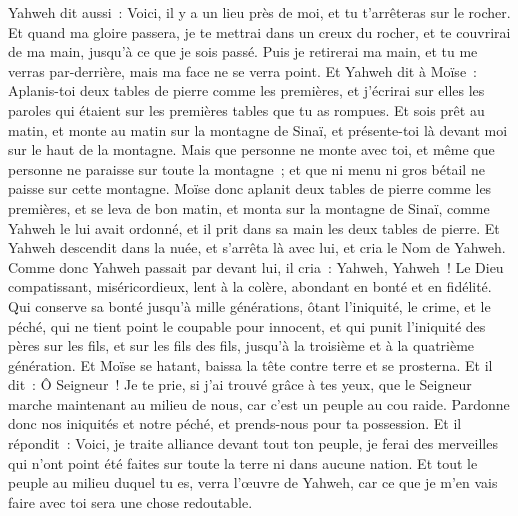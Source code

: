 \begin{multicols}{2}
Yahweh dit aussi~: Voici, il y a un lieu près de moi, et tu t'arrêteras sur le rocher.
Et quand ma gloire passera, je te mettrai dans un creux du rocher, et te couvrirai de ma main, jusqu'à ce que je sois passé.
Puis je retirerai ma main, et tu me verras par-derrière, mais ma face ne se verra point.
\VerseOne{}Et Yahweh dit à Moïse~: Aplanis-toi deux tables de pierre comme les premières, et j'écrirai sur elles les paroles qui étaient sur les premières tables que tu as rompues.
Et sois prêt au matin, et monte au matin sur la montagne de Sinaï, et présente-toi là devant moi sur le haut de la montagne.
Mais que personne ne monte avec toi, et même que personne ne paraisse sur toute la montagne~; et que ni menu ni gros bétail ne paisse sur cette montagne.
Moïse donc aplanit deux tables de pierre comme les premières, et se leva de bon matin, et monta sur la montagne de Sinaï, comme Yahweh le lui avait ordonné, et il prit dans sa main les deux tables de pierre.
Et Yahweh descendit dans la nuée, et s'arrêta là avec lui, et cria le Nom de Yahweh.
Comme donc Yahweh passait par devant lui, il cria~: Yahweh, Yahweh~! Le Dieu compatissant, miséricordieux, lent à la colère, abondant en bonté et en fidélité.
Qui conserve sa bonté jusqu'à mille générations, ôtant l'iniquité, le crime, et le péché, qui ne tient point le coupable pour innocent, et qui punit l'iniquité des pères sur les fils, et sur les fils des fils, jusqu'à la troisième et à la quatrième génération.
Et Moïse se hatant, baissa la tête contre terre et se prosterna. 
Et il dit~: Ô Seigneur~! Je te prie, si j'ai trouvé grâce à tes yeux, que le Seigneur marche maintenant au milieu de nous, car c'est un peuple au cou raide. Pardonne donc nos iniquités et notre péché, et prends-nous pour ta possession.
Et il répondit~: Voici, je traite alliance devant tout ton peuple, je ferai des merveilles qui n'ont point été faites sur toute la terre ni dans aucune nation. Et tout le peuple au milieu duquel tu es, verra l'œuvre de Yahweh, car ce que je m'en vais faire avec toi sera une chose redoutable.

\end{multicols}
